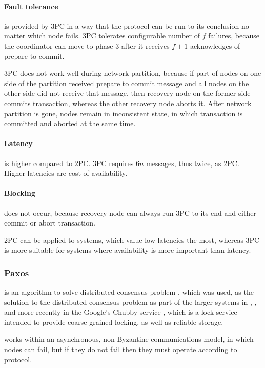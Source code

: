 \paragraph{Fault tolerance} is provided by 3PC in a way that the protocol can be run to its conclusion no matter which node fails. 3PC tolerates configurable number of $f$ failures, because the coordinator can move to phase 3 after it receives $f+1$ acknowledges of prepare to commit.

3PC does not work well during network partition, because if part of nodes on one side of the partition received prepare to commit message and all nodes on the other side did not receive that message, then recovery node on the former side commits transaction, whereas the other recovery node aborts it. After network partition is gone, nodes remain in inconsistent state, in which transaction is committed and aborted at the same time.

\paragraph{Latency} is higher compared to 2PC. 3PC requires $6n$ messages, thus twice, as 2PC. Higher latencies are cost of availability.

\paragraph{Blocking} does not occur, because recovery node can always run 3PC to its end and either commit or abort transaction.

2PC can be applied to systems, which value low latencies the most, whereas 3PC is more suitable for systems where availability is more important than latency.



\subsubsection{Paxos}
\paxos is an algorithm to solve distributed consensus problem \cite{Lamport1998partTimeParliment} \cite{lamport2001paxosMadeSimple}, which was used, as the solution to the distributed consensus problem as part of the larger systems in \cite{chandra2007PaxosMadeLive}, \cite{lampson1996build}, and more recently in the Google's Chubby service \cite{burrows2006chubby}, which is a lock service intended to provide coarse-grained locking, as well as reliable storage. 

\paxos works within an asynchronous, non-Byzantine communications model, in which nodes can fail, but if they do not fail then they must operate according to \paxos protocol.

